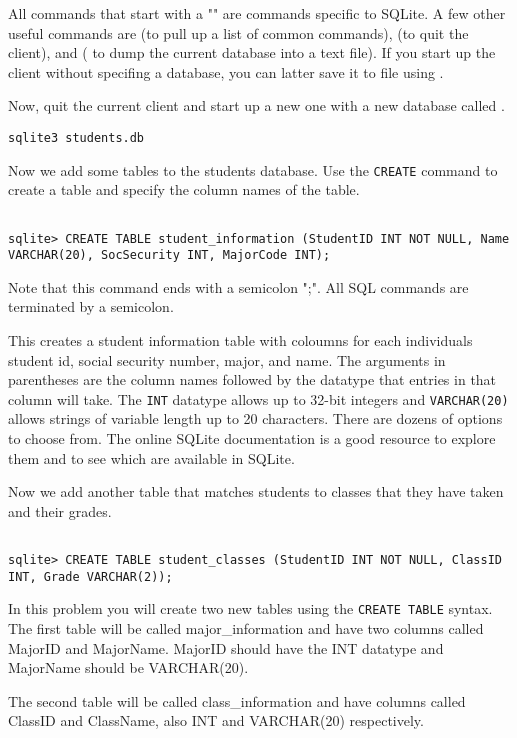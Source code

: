 All commands that start with a "" are commands specific to SQLite. A few other useful commands are  (to pull up a list of common commands),  (to quit the client), and  ( to dump the current database into a text file). If you start up the client without specifing a database, you can latter save it to file using .

Now, quit the current client and start up a new one with a new database called .

\begin{lstlisting}[style=ShellInput]
sqlite3 students.db
\end{lstlisting}

Now we add some tables to the students database. Use the {\tt CREATE} command to create a table and specify the column names of the table.

\begin{lstlisting}

sqlite> CREATE TABLE student_information (StudentID INT NOT NULL, Name VARCHAR(20), SocSecurity INT, MajorCode INT);

\end{lstlisting}

Note that this command ends with a semicolon ";". All SQL commands are terminated by a semicolon.

This creates a student information table with coloumns for each individuals student id, social security number, major, and name.  The arguments in parentheses are the column names followed by the datatype that entries in that column will take.  The {\tt INT} datatype allows up to 32-bit integers and {\tt VARCHAR(20)} allows strings of variable length up to 20 characters.  There are dozens of options to choose from.  The online SQLite documentation is a good resource to explore them and to see which are available in SQLite.

Now we add another table that matches students to classes that they have taken and their grades.

\begin{lstlisting}

sqlite> CREATE TABLE student_classes (StudentID INT NOT NULL, ClassID INT, Grade VARCHAR(2));

\end{lstlisting}

\begin{problem}

In this problem you will create two new tables using the {\tt CREATE TABLE} syntax.  The first table will be called major_information and have two columns called MajorID and MajorName.  MajorID should have the INT datatype and MajorName should be VARCHAR(20).

The second table will be called class_information and have columns called ClassID and ClassName, also INT and VARCHAR(20) respectively.

\end{problem}

